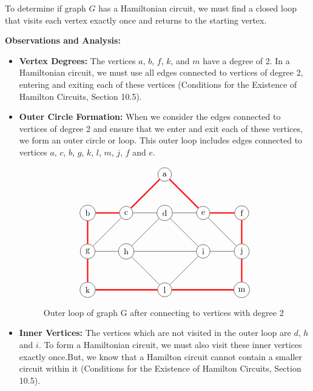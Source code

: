 \documentclass[12pt]{article}
\begin{document}
To determine if graph \( G \) has a Hamiltonian circuit, we must find a closed loop that visits each vertex exactly once and returns to the starting vertex.

\textbf{Observations and Analysis:}

\begin{itemize}
    \item \textbf{Vertex Degrees:} The vertices \( a \), \( b \), \( f \), \( k \), and \( m \) have a degree of 2. In a Hamiltonian circuit, we must use all edges connected to vertices of degree 2, entering and exiting each of these vertices (Conditions for the Existence of Hamilton Circuits, Section 10.5).
    
    \item \textbf{Outer Circle Formation:} When we consider the edges connected to vertices of degree 2 and ensure that we enter and exit each of these vertices, we form an outer circle or loop. This outer loop includes edges connected to vertices \( a \), \( c \), \( b \), \( g \), \( k \), \( l \), \( m \), \( j \), \( f \) and \( e \).
    \begin{figure}[H] 
        \[
    \begin{tikzpicture}[scale=0.8]
        \node[circle,draw] (a) at (0,4) {a};
        \node[circle,draw] (b) at (-4,2) {b};
        \node[circle,draw] (c) at (-2,2) {c};
        \node[circle,draw] (d) at (0,2) {d};
        \node[circle,draw] (e) at (2,2) {e};
        \node[circle,draw] (f) at (4,2) {f};
        \node[circle,draw] (g) at (-4,0) {g};
        \node[circle,draw] (h) at (-2,0) {h};
        \node[circle,draw] (i) at (2,0) {i};
        \node[circle,draw] (j) at (4,0) {j};
        \node[circle,draw] (k) at (-4,-2) {k};
        \node[circle,draw] (l) at (0,-2) {l};
        \node[circle,draw] (m) at (4,-2) {m};
        \draw (j) -- (e) edge[red, line width=1.5pt] (a);
        \draw (g) -- (c) edge[red, line width=1.5pt] (a);
        \draw (d) -- (h) -- (l) -- (i) -- (d);
        \draw (b) edge[red, line width=1.5pt] (g) ;
        \draw (g) edge[red, line width=1.5pt] (k);
        \draw (f) edge[red, line width=1.5pt] (j);
        \draw (j) edge[red, line width=1.5pt] (m);
        \draw (d) -- (c) edge[red, line width=1.5pt] (b);
        \draw (d) -- (e) edge[red, line width=1.5pt] (f);
        \draw (g) -- (h) -- (i) -- (j);
        \draw (k) edge[red, line width=1.5pt] (l);
        \draw (l) edge[red, line width=1.5pt] (m);
    \end{tikzpicture}
    \]
\caption{Outer loop of graph G after connecting  to vertices with degree 2}
\end{figure}
    \item \textbf{Inner Vertices:} The vertices which are not visited in the outer loop are \( d \), \( h \) and \( i \). To form a Hamiltonian circuit, we must also visit these inner vertices exactly once.But, we know that a Hamilton circuit cannot contain a smaller circuit within it (Conditions for the Existence of Hamilton Circuits, Section 10.5).
    

\end{itemize}
\end{document}
